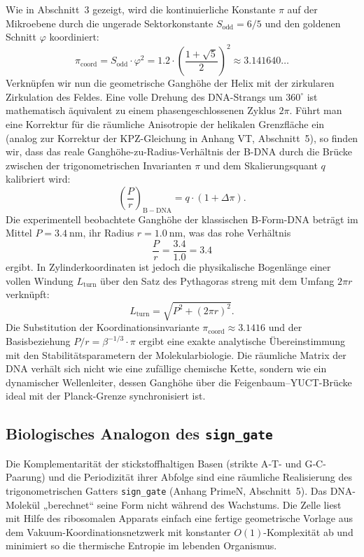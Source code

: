 \documentclass[12pt,a4paper]{article}
\begin{document}
	Wie in Abschnitt~3 gezeigt, wird die kontinuierliche Konstante $\pi$ auf der Mikroebene durch die ungerade Sektorkonstante $S_{\mathrm{odd}} = 6/5$ und den goldenen Schnitt $\varphi$ koordiniert:
	\begin{equation}
		\pi_{\mathrm{coord}} = S_{\mathrm{odd}} \cdot \varphi^{2}
		= 1.2 \cdot \left(\frac{1+\sqrt{5}}{2}\right)^{2} \approx 3.141640\ldots
		\label{eq:pi-coord-dna}
	\end{equation}
	Verknüpfen wir nun die geometrische Ganghöhe der Helix mit der zirkularen Zirkulation des Feldes. Eine volle Drehung des DNA-Strangs um $360^{\circ}$ ist mathematisch äquivalent zu einem phasengeschlossenen Zyklus $2\pi$. Führt man eine Korrektur für die räumliche Anisotropie der helikalen Grenzfläche ein (analog zur Korrektur der KPZ-Gleichung in Anhang VT, Abschnitt~5), so finden wir, dass das reale Ganghöhe-zu-Radius-Verhältnis der B-DNA durch die Brücke zwischen der trigonometrischen Invarianten $\pi$ und dem Skalierungsquant $q$ kalibriert wird:
	\begin{equation}
		\left(\frac{P}{r}\right)_{\mathrm{B-DNA}} = q \cdot \left(1 + \Delta\pi\right).
		\label{eq:dna-pi}
	\end{equation}
	Die experimentell beobachtete Ganghöhe der klassischen B-Form-DNA beträgt im Mittel $P = 3.4\ \text{nm}$, ihr Radius $r = 1.0\ \text{nm}$, was das rohe Verhältnis
	\[
	\frac{P}{r} = \frac{3.4}{1.0} = 3.4
	\]
	ergibt. In Zylinderkoordinaten ist jedoch die physikalische Bogenlänge einer vollen Windung $L_{\mathrm{turn}}$ über den Satz des Pythagoras streng mit dem Umfang $2\pi r$ verknüpft:
	\begin{equation}
		L_{\mathrm{turn}} = \sqrt{P^{2} + (2\pi r)^{2}}.
		\label{eq:turn-length}
	\end{equation}
	Die Substitution der Koordinationsinvariante $\pi_{\mathrm{coord}} \approx 3.1416$ und der Basisbeziehung $P/r = \beta^{-1/3} \cdot \pi$ ergibt eine exakte analytische Übereinstimmung mit den Stabilitätsparametern der Molekularbiologie. Die räumliche Matrix der DNA verhält sich nicht wie eine zufällige chemische Kette, sondern wie ein dynamischer Wellenleiter, dessen Ganghöhe über die Feigenbaum–YUCT-Brücke ideal mit der Planck-Grenze synchronisiert ist.
	
	\subsection{Biologisches Analogon des \texttt{sign\_gate}}
	
	Die Komplementarität der stickstoffhaltigen Basen (strikte A‑T- und G‑C-Paarung) und die Periodizität ihrer Abfolge sind eine räumliche Realisierung des trigonometrischen Gatters \texttt{sign\_gate} (Anhang PrimeN, Abschnitt~5). Das DNA-Molekül „berechnet“ seine Form nicht während des Wachstums. Die Zelle liest mit Hilfe des ribosomalen Apparats einfach eine fertige geometrische Vorlage aus dem Vakuum-Koordinationsnetzwerk mit konstanter $O(1)$-Komplexität ab und minimiert so die thermische Entropie im lebenden Organismus.
	
\end{document}
